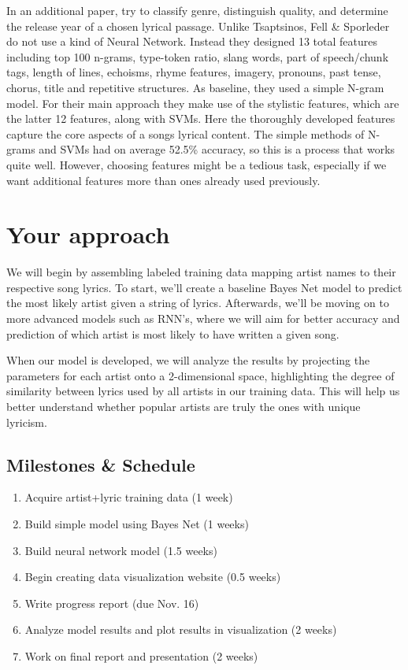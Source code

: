 \documentclass[11pt,a4paper]{article}
\begin{document}
In an additional paper,  try to classify genre, distinguish quality, and determine the release year of a chosen lyrical passage. 
Unlike Tsaptsinos, Fell \& Sporleder do not use a kind of Neural Network. 
Instead they designed 13 total features including top 100 n-grams, type-token ratio, slang words, part of speech/chunk tags, length of lines, echoisms, rhyme features, imagery, pronouns, past tense, chorus, title and repetitive structures. 
As baseline, they used a simple N-gram model. 
For their main approach they make use of the stylistic features, which are the latter 12 features, along with SVMs. 
Here the thoroughly developed features capture the core aspects of a songs lyrical content. 
The simple methods of N-grams and SVMs had on average 52.5\% accuracy, so this is a process that works quite well. 
However, choosing features might be a tedious task, especially if we want additional features more than ones already used previously. 

\section{Your approach}
We will begin by assembling labeled training data mapping artist names to their respective song lyrics. To start, we'll create a baseline Bayes Net model to predict the most likely artist given a string of lyrics. Afterwards, we'll be moving on to more advanced models such as RNN's, where we will aim for better accuracy and prediction of which artist is most likely to have written a given song. 

When our model is developed, we will analyze the results by projecting the parameters for each artist onto a 2-dimensional space, highlighting the degree of similarity between lyrics used by all artists in our training data. This will help us better understand whether popular artists are truly the ones with unique lyricism.

\subsection{Milestones \& Schedule}


\begin{enumerate}
    \item Acquire artist+lyric training data  (1 week)
    \item Build simple model using Bayes Net (1 weeks)
    \item Build neural network model (1.5 weeks)
    \item Begin creating data visualization website (0.5 weeks)
    \item Write progress report (due Nov. 16)
    \item Analyze model results and plot results in visualization (2 weeks)
    \item Work on final report and presentation (2 weeks)
\end{enumerate}
\end{document}
